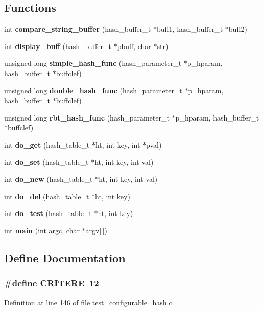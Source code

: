 \subsection*{Functions}
\begin{CompactItemize}
\item 
int {\bf compare\_\-string\_\-buffer} (hash\_\-buffer\_\-t $\ast$buff1, hash\_\-buffer\_\-t $\ast$buff2)
\item 
int {\bf display\_\-buff} (hash\_\-buffer\_\-t $\ast$pbuff, char $\ast$str)
\item 
unsigned long {\bf simple\_\-hash\_\-func} (hash\_\-parameter\_\-t $\ast$p\_\-hparam, hash\_\-buffer\_\-t $\ast$buffclef)
\item 
unsigned long {\bf double\_\-hash\_\-func} (hash\_\-parameter\_\-t $\ast$p\_\-hparam, hash\_\-buffer\_\-t $\ast$buffclef)
\item 
unsigned long {\bf rbt\_\-hash\_\-func} (hash\_\-parameter\_\-t $\ast$p\_\-hparam, hash\_\-buffer\_\-t $\ast$buffclef)
\item 
int {\bf do\_\-get} (hash\_\-table\_\-t $\ast$ht, int key, int $\ast$pval)
\item 
int {\bf do\_\-set} (hash\_\-table\_\-t $\ast$ht, int key, int val)
\item 
int {\bf do\_\-new} (hash\_\-table\_\-t $\ast$ht, int key, int val)
\item 
int {\bf do\_\-del} (hash\_\-table\_\-t $\ast$ht, int key)
\item 
int {\bf do\_\-test} (hash\_\-table\_\-t $\ast$ht, int key)
\item 
int {\bf main} (int argc, char $\ast$argv[$\,$])
\end{CompactItemize}


\subsection{Define Documentation}
\subsubsection[{CRITERE}]{\setlength{\rightskip}{0pt plus 5cm}\#define CRITERE~12}\label{test__configurable__hash_8c_b2da1e226a5beeff3269ec19b1f2b0b9}




Definition at line 146 of file test\_\-configurable\_\-hash.c.
